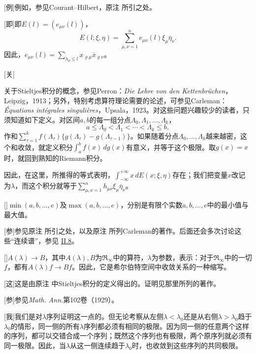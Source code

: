\documentclass[fontsize=13pt,twoside,openany,headings=normal,parskip=false,bookmarkpackage=false,DIV=calc]{scrbook}
\begin{document}
[例]{例如，参见Courant–Hilbert，原注 \hyperlink{note-30}{} 所引之处。\hypertarget{origpage-244}{}\label{origpage-244}}

[即]{即$E(l)=(e_{\mu\nu}(l))$，
\[
E(l;\xi,\eta)=\sum_{\mu,\nu=1}^{n}e_{\mu\nu}(l)\xi_\mu\bar\eta_\nu.
\]
因此，$e_{\mu\nu}(l)=\sum_{\lambda_\varrho\le l}x_{\varrho\mu}\bar x_{\varrho\nu}$。}

[关]{关于Stieltjes积分的概念，参见Perron：\emph{Die Lehre von den Kettenbrüchen}，Leipzig，1913；另外，特别考虑算符理论需要的论述，可参见Carleman：\emph{Équations intégrales singulières}，Upsala，1923。对这些问题兴趣较少的读者，只须知道如下定义。对区间$a,\allowbreak b$的每一组分点$\Lambda_0,\allowbreak \Lambda_1,\allowbreak \ldots,\allowbreak \Lambda_k$，
\[
a\le\Lambda_0<\Lambda_1<\cdots<\Lambda_k\le b,
\]
作和$\sum_{\tau=1}^{k}f(\Lambda_\tau)\{g(\Lambda_\tau)-g(\Lambda_{\tau-1})\}$。如果随着分点$\Lambda_0,\allowbreak \ldots,\allowbreak \Lambda_k$越来越密，这个和收敛，就定义积分$\int_a^bf(x)\,dg(x)$有意义，并等于这个极限。取$g(x)=x$时，就回到熟知的Riemann积分。

因此，在这里，所推得的等式表明，$\int_{-\infty}^{+\infty}x\,dE(x;\xi,\allowbreak \eta)$存在；我们把变量$x$改记为$\lambda$，而这个积分就等于$\sum_{\mu,\allowbreak \nu=1}^{n}h_{\mu\nu}\xi_\mu\bar\eta_\nu$。}

[]{$\min(a,\allowbreak b,\allowbreak \ldots,\allowbreak e)$及$\max(a,\allowbreak b,\allowbreak \ldots,\allowbreak e)$，分别是有限个实数$a,\allowbreak b,\allowbreak \ldots,\allowbreak e$中的最小值与最大值。}

[参]{参见原注 \hyperlink{note-64}{} 所引之处，以及原注 \hyperlink{note-73}{} 所列Carleman的著作。后面还会多次讨论这些“连续谱”，参见 \hyperref[sec:II.8]{II.8}。}

[]{$A(\lambda)\to B$，其中$A(\lambda),\allowbreak B$为$\mathfrak R_\infty$中的算符，$\lambda$为参数，表示：对于$\mathfrak R_\infty$中的一切$f$，都有$A(\lambda)f\to Bf$。因此，它是希尔伯特空间中收敛关系的一种缩写。}

[这]{这是由原注 \hyperlink{note-73}{} 中Stieltjes积分的定义得出的。证明见那里所列的著作。}

[参]{参见\emph{Math. Ann.}第102卷（1929）。}

[我]{我们是对$\lambda$序列证明这一点的。但无论考察从左侧$\lambda<\lambda_0$还是从右侧$\lambda>\lambda_0$趋于$\lambda_0$的情形，同一侧的所有$\lambda$序列都必须有相同的极限。因为同一侧的任意两个这样的序列，都可以交错合成一个序列；既然这个序列也有极限，两个原序列就必须有同一极限。因此，当$\lambda$从这一侧连续趋于$\lambda_0$时，也收敛到这些序列的共同极限。}
\end{document}
